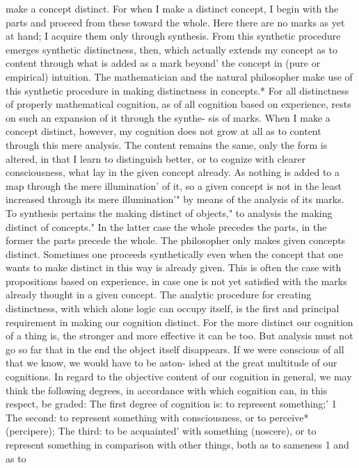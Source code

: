 make a concept distinct.
For when I make a distinct concept, I begin with the parts and proceed
from these toward the whole. Here there are no marks as yet at hand; I
acquire them only through synthesis. From this synthetic procedure
emerges synthetic distinctness, then, which actually extends my concept
as to content through what is added as a mark beyond' the concept in (pure
or empirical) intuition. The mathematician and the natural philosopher
make use of this synthetic procedure in making distinctness in concepts.*
For all distinctness of properly mathematical cognition, as of all cognition
based on experience, rests on such an expansion of it through the synthe-
sis of marks.
When I make a concept distinct, however, my cognition does not grow
at all as to content through this mere analysis. The content remains the
same, only the form is altered, in that I learn to distinguish better, or to
cognize with clearer consciousness, what lay in the given concept already.
As nothing is added to a map through the mere illumination' of it, so a
given concept is not in the least increased through its mere illumination'"
by means of the analysis of its marks.
To synthesis pertains the making distinct of objects," to analysis the
making distinct of concepts." In the latter case the whole precedes the parts, in
the former the parts precede the whole. The philosopher only makes given
concepts distinct. Sometimes one proceeds synthetically even when the
concept that one wants to make distinct in this way is already given. This is
often the case with propositions based on experience, in case one is not
yet satisfied with the marks already thought in a given concept.
The analytic procedure for creating distinctness, with which alone logic
can occupy itself, is the first and principal requirement in making our
cognition distinct. For the more distinct our cognition of a thing is, the
stronger and more effective it can be too. But analysis must not go so far
that in the end the object itself disappears.
If we were conscious of all that we know, we would have to be aston-
ished at the great multitude of our cognitions.
In regard to the objective content of our cognition in general, we may
think the following degrees, in accordance with which cognition can, in this
respect, be graded:
The first degree of cognition is: to represent something;' 1
The second: to represent something with consciousness, or to perceive*
(percipere);
The third: to be acquainted' with something (noscere), or to represent
something in comparison with other things, both as to sameness 1 and as to
